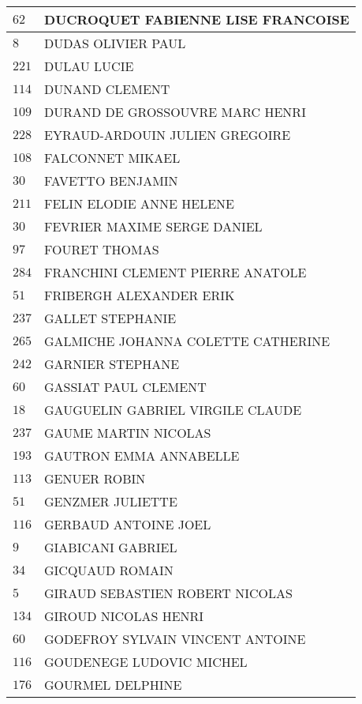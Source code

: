 \begin{xltabular}{\linewidth}{|l|X|}
    \hline
    $62$ & DUCROQUET FABIENNE LISE FRANCOISE \\
    \hline
    $8$ & DUDAS OLIVIER PAUL \\
    \hline
    $221$ & DULAU LUCIE \\
    \hline
    $114$ & DUNAND CLEMENT \\
    \hline
    $109$ & DURAND DE GROSSOUVRE MARC HENRI \\
    \hline
    $228$ & EYRAUD-ARDOUIN JULIEN GREGOIRE \\
    \hline
    $108$ & FALCONNET MIKAEL \\
    \hline
    $30$ & FAVETTO BENJAMIN \\
    \hline
    $211$ & FELIN ELODIE ANNE HELENE \\
    \hline
    $30$ & FEVRIER MAXIME SERGE DANIEL \\
    \hline
    $97$ & FOURET THOMAS \\
    \hline
    $284$ & FRANCHINI CLEMENT PIERRE ANATOLE \\
    \hline
    $51$ & FRIBERGH ALEXANDER ERIK \\
    \hline
    $237$ & GALLET STEPHANIE \\
    \hline
    $265$ & GALMICHE JOHANNA COLETTE CATHERINE \\
    \hline
    $242$ & GARNIER STEPHANE \\
    \hline
    $60$ & GASSIAT PAUL CLEMENT \\
    \hline
    $18$ & GAUGUELIN GABRIEL VIRGILE CLAUDE \\
    \hline
    $237$ & GAUME MARTIN NICOLAS \\
    \hline
    $193$ & GAUTRON EMMA ANNABELLE \\
    \hline
    $113$ & GENUER ROBIN \\
    \hline
    $51$ & GENZMER JULIETTE \\
    \hline
    $116$ & GERBAUD ANTOINE JOEL \\
    \hline
    $9$ & GIABICANI GABRIEL \\
    \hline
    $34$ & GICQUAUD ROMAIN \\
    \hline
    $5$ & GIRAUD SEBASTIEN ROBERT NICOLAS \\
    \hline
    $134$ & GIROUD NICOLAS HENRI \\
    \hline
    $60$ & GODEFROY SYLVAIN VINCENT ANTOINE \\
    \hline
    $116$ & GOUDENEGE LUDOVIC MICHEL \\
    \hline
    $176$ & GOURMEL DELPHINE \\

\end{xltabular}
